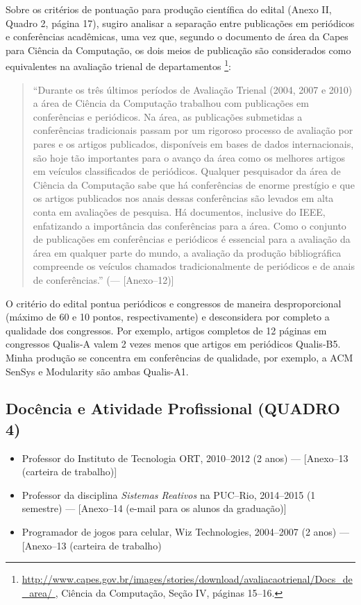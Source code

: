 \documentclass[12pt,a4paper]{article}
\begin{document}
Sobre os critérios de pontuação para produção científica do edital (Anexo II, 
Quadro 2, página 17), sugiro analisar a separação entre publicações em 
periódicos e conferências acadêmicas, uma vez que, segundo o documento de área 
da Capes para Ciência da Computação, os dois meios de publicação são 
considerados como equivalentes na avaliação trienal de departamentos%
\footnote{\url{
http://www.capes.gov.br/images/stories/download/avaliacaotrienal/Docs_de_area/
},
Ciência da Computação, Seção IV, páginas 15--16.
}:
\begin{quote}
``Durante os três últimos períodos de Avaliação Trienal (2004, 2007 e 2010) a 
área de Ciência da Computação trabalhou com publicações em conferências e 
periódicos.
Na área, as publicações submetidas a conferências tradicionais passam por um 
rigoroso processo de avaliação por pares e os artigos publicados, disponíveis 
em bases de dados internacionais, são hoje tão importantes para o avanço da 
área como os melhores artigos em veículos classificados de periódicos.
Qualquer pesquisador da área de Ciência da Computação sabe que há conferências 
de enorme prestígio e que os artigos publicados nos anais dessas conferências 
são levados em alta conta em avaliações de pesquisa.
Há documentos, inclusive do IEEE, enfatizando a importância das conferências 
para a área.
Como o conjunto de publicações em conferências e periódicos é essencial para a 
avaliação da área em qualquer parte do mundo, a avaliação da produção 
bibliográfica compreende os veículos chamados tradicionalmente de periódicos e 
de anais de conferências.''
(--- [Anexo--12)]
\end{quote}

O critério do edital pontua periódicos e congressos de maneira desproporcional 
(máximo de 60 e 10 pontos, respectivamente) e desconsidera por completo a 
qualidade dos congressos.
Por exemplo, artigos completos de 12 páginas em congressos Qualis-A valem 2 
vezes menos que artigos em periódicos Qualis-B5.
Minha produção se concentra em conferências de qualidade, por exemplo, a ACM 
SenSys e Modularity são ambas Qualis-A1.

\subsection*{Docência e Atividade Profissional (QUADRO 4)}

\begin{itemize}
\item
Professor do Instituto de Tecnologia ORT, 2010--2012 (2 anos)
--- [Anexo--13 (carteira de trabalho)]
\item
Professor da disciplina \emph{Sistemas Reativos} na PUC--Rio, 2014--2015 (1 
semestre)
--- [Anexo--14 (e-mail para os alunos da graduação)]
\item
Programador de jogos para celular, Wiz Technologies, 2004--2007 (2 anos)
--- [Anexo--13 (carteira de trabalho)
\end{itemize}

\newpage


\end{document}
